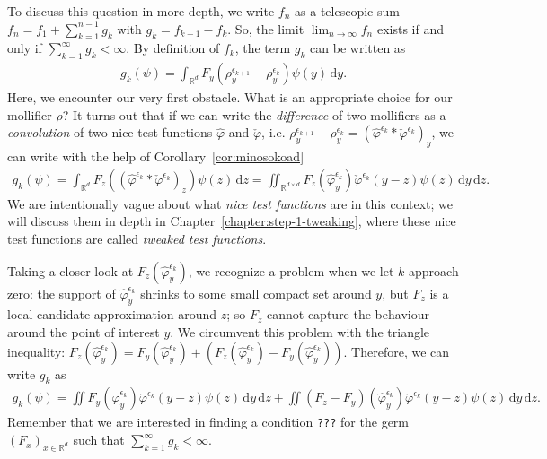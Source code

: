 To discuss this question in more depth, we write \(f_n\) as a telescopic sum \(f_n = f_1 + \sum^{n-1}_{k=1}g_k\) with \(g_k = f_{k+1} - f_k\). So, the limit \(\lim_{n \to \infty} f_n\) exists if and only if \(\sum^\infty_{k=1}g_k < {\infty}\). By definition of \(f_{k}\), the term \(g_k\) can be written as  
\begin{align*}
        g_k(\psi) = \int_{\mathbb{R}^d} F_y(\rho_y^{\epsilon_{k+1}} - \rho_y^{\epsilon_k}) \psi(y)\, \mathrm{d}y.
\end{align*}
Here, we encounter our very first obstacle. What is an appropriate choice for our mollifier \( \rho \)? It turns out that if we can write the \emph{difference} of two mollifiers as a \emph{convolution} of two nice test functions \( \hat \varphi \) and \(\check {\varphi}\), i.e. \( \rho^{\epsilon_{k+1}}_y - \rho^{\epsilon_k}_y = {(\hat \varphi^{\epsilon_k} * \check \varphi^{\epsilon_k})}_y\), 
we can write with the help of Corollary~\ref{cor:minosokoad}
\begin{align*}
    g_k(\psi) = \int_{\mathbb{R}^d} F_z({(\hat \varphi^{\epsilon_k} * \check \varphi^{\epsilon_k})}_z) \psi(z)\, \mathrm{d}z
    = \iint_{\mathbb{R}^{d \times d}} F_z(\hat \varphi^{\epsilon_k}_y) \check \varphi^{\epsilon_k}(y-z) \psi(z) \, \mathrm{d}y\, \mathrm{d}z.
\end{align*}
We are intentionally vague about what \emph{nice test functions} are in this context; we will discuss them in depth in Chapter~\ref{chapter:step-1-tweaking}, where these nice test functions are called \emph{tweaked test functions}.

Taking a closer look at \(F_z(\hat \varphi^{\epsilon_k}_y)\), we recognize a problem when we let \(k\) approach zero: the support of \(\hat \varphi^{\epsilon_k}_y\) shrinks to some small compact set around \(y\), but \(F_z\) is a local candidate approximation around \(z\); so \(F_z\) cannot capture the behaviour around the point of interest \(y\). We circumvent this problem with the triangle inequality: \(F_z(\hat \varphi^{\epsilon_k}_y) = F_y(\hat \varphi^{\epsilon_k}_y) + \left(F_z(\hat \varphi^{\epsilon_k}_y) - F_y(\hat \varphi^{\epsilon_k}_y)\right)\). 
Therefore, we can write \(g_k\) as 
\begin{align*}
        g_k(\psi) = \iint F_y(\hat \varphi^{\epsilon_k}_y) \check \varphi^{\epsilon_k}(y-z) \psi(z) \, \mathrm{d}y\, \mathrm{d}z 
        + \iint (F_z - F_y)(\hat \varphi^{\epsilon_k}_y) \check \varphi^{\epsilon_k}(y-z) \psi(z) \, \mathrm{d}y\, \mathrm{d}z .
\end{align*}
Remember that we are interested in finding a condition \texttt{???} for the germ \({(F_x)}_{x \in \mathbb{R}^d}\)  such that \(\sum^\infty_{k=1} g_k < {\infty}\). 

